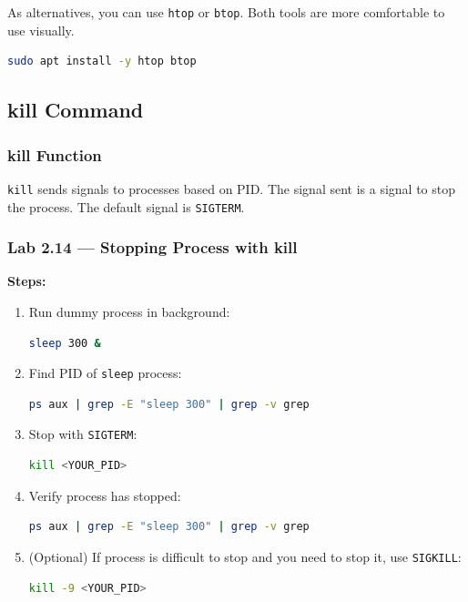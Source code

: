 \begin{tipbox}
As alternatives, you can use \texttt{htop} or \texttt{btop}. Both tools are more comfortable to use visually.
\begin{lstlisting}[language=bash]
sudo apt install -y htop btop
\end{lstlisting}
\end{tipbox}

\subsection{kill Command}
\subsubsection*{kill Function}
\texttt{kill} sends signals to processes based on PID. The signal sent is a signal to stop the process.
The default signal is \texttt{SIGTERM}.

\subsubsection*{Lab 2.14 --- Stopping Process with kill}
\textbf{Steps:}
\begin{enumerate}
    \item Run dummy process in background:
\begin{lstlisting}[language=bash, caption={Create dummy process}]
sleep 300 &
\end{lstlisting}

    \item Find PID of \texttt{sleep} process:
\begin{lstlisting}[language=bash, caption={Find sleep PID}]
ps aux | grep -E "sleep 300" | grep -v grep
\end{lstlisting}

    \item Stop with \texttt{SIGTERM}:
\begin{lstlisting}[language=bash, caption={Send SIGTERM}]
kill <YOUR_PID>
\end{lstlisting}

    \item Verify process has stopped:
\begin{lstlisting}[language=bash, caption={Verify process has stopped}]
ps aux | grep -E "sleep 300" | grep -v grep
\end{lstlisting}

    \item (Optional) If process is difficult to stop and you need to stop it, use \texttt{SIGKILL}:
\begin{lstlisting}[language=bash, caption={Send SIGKILL (optional)}]
kill -9 <YOUR_PID>
\end{lstlisting}
\end{enumerate}

